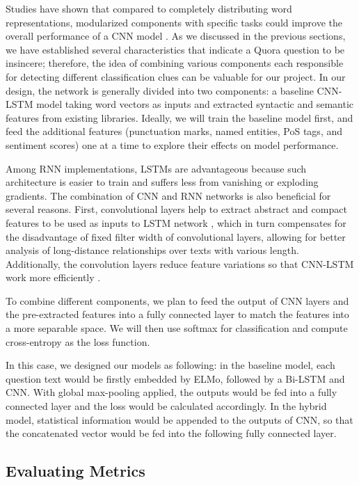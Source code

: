 \documentclass[12pt]{diazessay} %
\begin{document}
{Studies have shown that compared to completely distributing word representations, modularized components with specific tasks could improve the overall performance of a CNN model \citep{poria2017}. As we discussed in the previous sections, we have established several characteristics that indicate a Quora question to be insincere; therefore, the idea of combining various components each responsible for detecting different classification clues can be valuable for our project. In our design, the network is generally divided into two components: a baseline CNN-LSTM model taking word vectors as inputs and extracted syntactic and semantic features from existing libraries. Ideally, we will train the baseline model first, and feed the additional features (punctuation marks, named entities, PoS tags, and sentiment scores) one at a time to explore their effects on model performance. 

Among RNN implementations, LSTMs are advantageous because such architecture is easier to train and suffers less from vanishing or exploding gradients. The combination of CNN and RNN networks is also beneficial for several reasons. First, convolutional layers help to extract abstract and compact features to be used as inputs to LSTM network \citep{chan2015}, which in turn compensates for the disadvantage of fixed filter width of convolutional layers, allowing for better analysis of long-distance relationships over texts with various length. Additionally, the convolution layers reduce feature variations so that CNN-LSTM work more efficiently \citep{ghosh2016}. 

To combine different components, we plan to feed the output of CNN layers and the pre-extracted features into a fully connected layer to match the features into a more separable space. We will then use softmax for classification and compute cross-entropy as the loss function. 

In this case, we designed our models as following: in the baseline model, each question text would be firstly embedded by ELMo, followed by a Bi-LSTM and CNN. With global max-pooling applied, the outputs would be fed into a fully connected layer and the loss would be calculated accordingly. In the hybrid model, statistical information would be appended to the outputs of CNN, so that the concatenated vector would be fed into the following fully connected layer.

\subsection{Evaluating Metrics}

}
\end{document}
